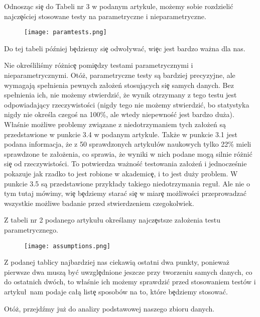 \documentclass{article}
\begin{document}
\newpage
\noindent
\quad Odnosząc si\c e do Tabeli nr 3 w podanym artykule, możemy sobie rozdzieli\'c najcz\c eściej stosowane testy na parametryczne i nieparametryczne.

\begin{figure}[h!]
\centering
\texttt{[image: paramtests.png]}
\end{figure}

\noindent
\quad Do tej tabeli później b\c edziemy si\c e odwo\l ywa\'c, wi\c ec jest bardzo ważna dla nas. 

\noindent
\quad Nie określiliśmy różnic\c e pomi\c edzy testami parametrycznymi i nieparametrycznymi. Otóż, parametryczne testy są bardziej precyzyjne, ale wymagają spe\l nienia pewnych za\l ożeń stosujących si\c e samych danych. Bez spe\l nienia ich, nie możemy stwierdzi\'c, że wynik otrzymany z tego testu jest odpowiadający rzeczywistości (nigdy tego nie możemy stwierdzi\'c, bo statystyka nigdy nie określa czegoś na 100\%, ale wtedy niepewnoś\'c jest bardzo duża). W\l aśnie możliwe problemy związane z niedotrzymaniem tych za\l ożeń są przedstawione w punkcie 3.4 w podanym artykule. Także w punkcie 3.1 jest podana informacja, że z 50 sprawdzonych artyku\l ów naukowych tylko 22\% mieli sprawdzone te za\l ożenia, co sprawia, że wyniki w nich podane mogą silnie różni\'c si\c e od rzeczywistości. To potwierdza ważnoś\'c testowania za\l ożeń i jednocześnie pokazuje jak rzadko to jest robione w akademic\c e, i to jest duży problem. W punkcie 3.5 są przedstawione przyk\l ady takiego niedotrzymania regu\l. Ale nie o tym tutaj mówimy, wi\c e b\c edziemy stara\'c si\c e w miar\c e możliwości przeprowadza\'c wszystkie możliwe badanie przed stwierdzeniem czegokolwiek.

\noindent
\quad Z tabeli nr 2 podanego artyku\l u określamy najcz\c estsze za\l ożenia testu parametrycznego.

\begin{figure}[h!]
\centering
\texttt{[image: assumptions.png]}
\end{figure}

\noindent
\quad Z podanej tablicy najbardziej nas ciekawią ostatni dwa punkty, ponieważ pierwsze dwa muszą by\'c uwzgl\c ednione jeszcze przy tworzeniu samych danych, co do ostatnich dwóch, to w\l aśnie ich możemy sprawdzi\'c przed stosowaniem testów i artyku\l\ nam podaje ca\l ą list\c e sposobów na to, które b\c edziemy stosowa\'c.

\noindent
\quad Otóż, przejdźmy już do analizy podstawowej naszego zbioru danych.
\end{document}
